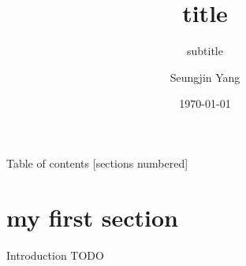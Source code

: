 \documentclass[10pt]{beamer}
\title{title}
\subtitle{subtitle}
\author{Seungjin Yang}
\institute[VFU]{University of Seoul}
\date{\today}
\begin{document}
\begin{frame}
    \maketitle
\end{frame}

\begin{frame}{Table of contents}
  [sections numbered]
  \tableofcontents%
\end{frame}

\section{my first section}

\begin{frame}[fragile]{Introduction}
    TODO
\end{frame}
\end{document}
